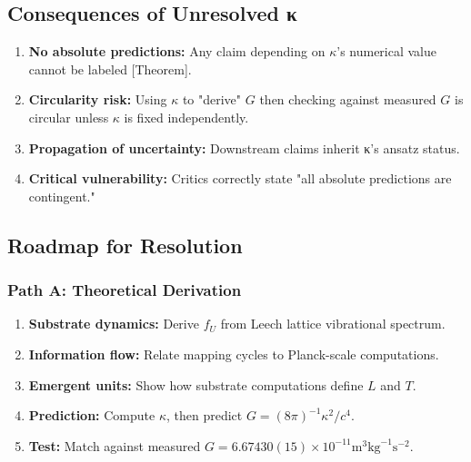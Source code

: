 \subsection{Consequences of Unresolved κ}

\begin{enumerate}
\item \textbf{No absolute predictions:} Any claim depending on $\kappa$'s numerical value cannot be labeled [Theorem].

\item \textbf{Circularity risk:} Using $\kappa$ to "derive" $G$ then checking against measured $G$ is circular unless $\kappa$ is fixed independently.

\item \textbf{Propagation of uncertainty:} Downstream claims inherit κ's ansatz status.

\item \textbf{Critical vulnerability:} Critics correctly state "all absolute predictions are contingent."
\end{enumerate}

\subsection{Roadmap for Resolution}

\subsubsection{Path A: Theoretical Derivation}
\begin{enumerate}
\item \textbf{Substrate dynamics:} Derive $f_U$ from Leech lattice vibrational spectrum.
\item \textbf{Information flow:} Relate mapping cycles to Planck-scale computations.
\item \textbf{Emergent units:} Show how substrate computations define $L$ and $T$.
\item \textbf{Prediction:} Compute $\kappa$, then predict $G = (8\pi)^{-1} \kappa^2 / c^4$.
\item \textbf{Test:} Match against measured $G = 6.67430(15) \times 10^{-11} \text{m}^3\text{kg}^{-1}\text{s}^{-2}$.
\end{enumerate}

